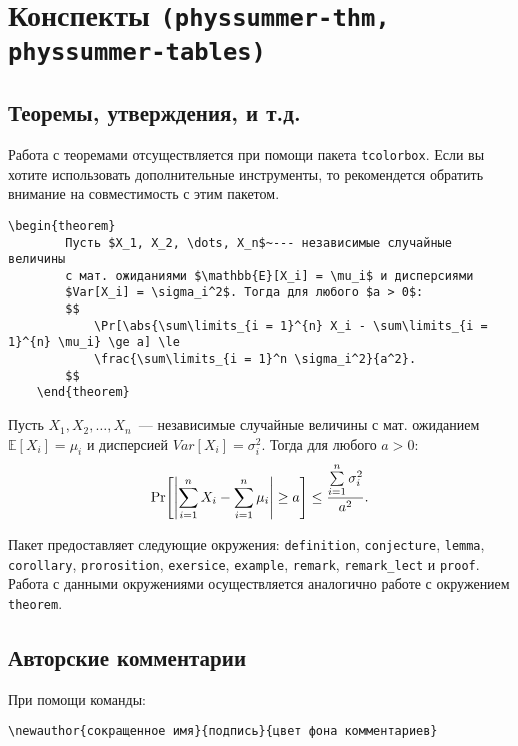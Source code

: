 \section{Конспекты \texttt{(physsummer-thm, physsummer-tables)}}

\subsection{Теоремы, утверждения, и т.д.}

Работа с теоремами отсуществляется при помощи пакета \texttt{tcolorbox}. Если вы хотите использовать
дополнительные инструменты, то рекомендется обратить внимание на совместимость с этим пакетом.

\begin{lstlisting}[gobble = 3]
    \begin{theorem}
        Пусть $X_1, X_2, \dots, X_n$~--- независимые случайные величины
        с мат. ожиданиями $\mathbb{E}[X_i] = \mu_i$ и дисперсиями
        $Var[X_i] = \sigma_i^2$. Тогда для любого $a > 0$:
        $$
            \Pr[\abs{\sum\limits_{i = 1}^{n} X_i - \sum\limits_{i = 1}^{n} \mu_i} \ge a] \le 
            \frac{\sum\limits_{i = 1}^n \sigma_i^2}{a^2}.
        $$
    \end{theorem}
\end{lstlisting}

\begin{theorem}
    Пусть $X_1, X_2, \dots, X_n$~--- независимые случайные величины с мат. ожиданием $\mathbb{E}[X_i] =
    \mu_i$ и дисперсией $Var[X_i] = \sigma_i^2$. Тогда для любого $a > 0$:
    $$
        \Pr[\abs{\sum\limits_{i = 1}^{n} X_i - \sum\limits_{i = 1}^{n} \mu_i} \ge a] \le
        \frac{\sum\limits_{i = 1}^n \sigma_i^2}{a^2}.
    $$
\end{theorem}

Пакет предоставляет следующие окружения: \texttt{definition}, \texttt{conjecture}, \texttt{lemma},
\texttt{corollary}, \texttt{prorosition}, \texttt{exersice}, \texttt{example}, \texttt{remark},
\texttt{remark\_lect} и \texttt{proof}. Работа с данными окружениями осуществляется аналогично работе с
окружением \texttt{theorem}.


\subsection{Авторские комментарии}
\label{sec:authors}

При помощи команды:
\begin{lstlisting}[gobble = 3]
    \newauthor{сокращенное имя}{подпись}{цвет фона комментариев}
\end{lstlisting}

